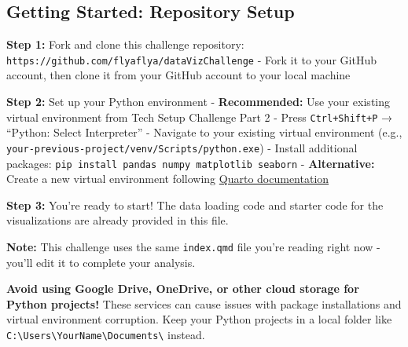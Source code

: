 \documentclass[
  letterpaper,
  DIV=11,
  numbers=noendperiod]{scrartcl}
\begin{document}
\subsection{Getting Started: Repository Setup
🚀}\label{getting-started-repository-setup}

\begin{tcolorbox}[enhanced jigsaw, rightrule=.15mm, coltitle=black, colbacktitle=quarto-callout-important-color!10!white, opacitybacktitle=0.6, arc=.35mm, leftrule=.75mm, colback=white, title=\textcolor{quarto-callout-important-color}{\faExclamation}\hspace{0.5em}{📁 Getting Started}, colframe=quarto-callout-important-color-frame, bottomrule=.15mm, left=2mm, opacityback=0, toptitle=1mm, titlerule=0mm, toprule=.15mm, bottomtitle=1mm, breakable]

\textbf{Step 1:} Fork and clone this challenge repository:
\texttt{https://github.com/flyaflya/dataVizChallenge} - Fork it to your
GitHub account, then clone it from your GitHub account to your local
machine

\textbf{Step 2:} Set up your Python environment - \textbf{Recommended:}
Use your existing virtual environment from Tech Setup Challenge Part 2 -
Press \texttt{Ctrl+Shift+P} → ``Python: Select Interpreter'' - Navigate
to your existing virtual environment (e.g.,
\texttt{your-previous-project/venv/Scripts/python.exe}) - Install
additional packages:
\texttt{pip\ install\ pandas\ numpy\ matplotlib\ seaborn} -
\textbf{Alternative:} Create a new virtual environment following
\href{https://quarto.org/docs/projects/virtual-environments.html}{Quarto
documentation}

\textbf{Step 3:} You're ready to start! The data loading code and
starter code for the visualizations are already provided in this file.

\textbf{Note:} This challenge uses the same \texttt{index.qmd} file
you're reading right now - you'll edit it to complete your analysis.

\end{tcolorbox}

\begin{tcolorbox}[enhanced jigsaw, rightrule=.15mm, coltitle=black, colbacktitle=quarto-callout-warning-color!10!white, opacitybacktitle=0.6, arc=.35mm, leftrule=.75mm, colback=white, title=\textcolor{quarto-callout-warning-color}{\faExclamationTriangle}\hspace{0.5em}{⚠️ Cloud Storage Warning}, colframe=quarto-callout-warning-color-frame, bottomrule=.15mm, left=2mm, opacityback=0, toptitle=1mm, titlerule=0mm, toprule=.15mm, bottomtitle=1mm, breakable]

\textbf{Avoid using Google Drive, OneDrive, or other cloud storage for
Python projects!} These services can cause issues with package
installations and virtual environment corruption. Keep your Python
projects in a local folder like
\texttt{C:\textbackslash{}Users\textbackslash{}YourName\textbackslash{}Documents\textbackslash{}}
instead.

\end{tcolorbox}
\end{document}
